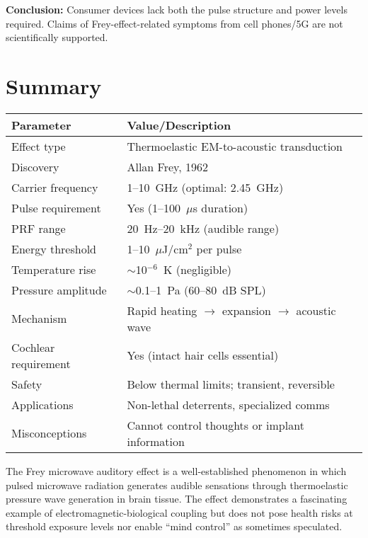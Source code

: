 \textbf{Conclusion:} Consumer devices lack both the pulse structure and power levels required. Claims of Frey-effect-related symptoms from cell phones/5G are not scientifically supported.

\section{Summary}

\begin{center}
\begin{tabular}{@{}ll@{}}
\toprule
\textbf{Parameter} & \textbf{Value/Description} \\
\midrule
Effect type & Thermoelastic EM-to-acoustic transduction \\
Discovery & Allan Frey, 1962 \\
Carrier frequency & 1--10~GHz (optimal: 2.45~GHz) \\
Pulse requirement & Yes (1--100~$\mu$s duration) \\
PRF range & 20~Hz--20~kHz (audible range) \\
Energy threshold & 1--10~$\mu$J/cm$^2$ per pulse \\
Temperature rise & $\sim$10$^{-6}$~K (negligible) \\
Pressure amplitude & $\sim$0.1--1~Pa (60--80~dB SPL) \\
Mechanism & Rapid heating $\rightarrow$ expansion $\rightarrow$ acoustic wave \\
Cochlear requirement & Yes (intact hair cells essential) \\
Safety & Below thermal limits; transient, reversible \\
Applications & Non-lethal deterrents, specialized comms \\
Misconceptions & Cannot control thoughts or implant information \\
\bottomrule
\end{tabular}
\end{center}

\begin{keyconcept}
The Frey microwave auditory effect is a well-established phenomenon in which pulsed microwave radiation generates audible sensations through thermoelastic pressure wave generation in brain tissue. The effect demonstrates a fascinating example of electromagnetic-biological coupling but does not pose health risks at threshold exposure levels nor enable ``mind control'' as sometimes speculated.
\end{keyconcept}

